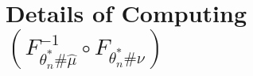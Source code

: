
\section{Details of Computing $(F_{\theta_{n}^*\#\hat{\mu}}^{-1} \circ F_{\theta^*_{n}\#\nu}) $}



